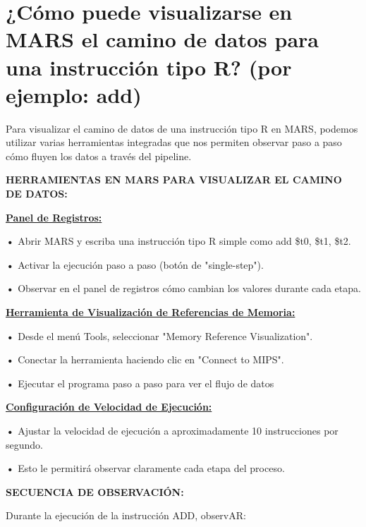 \documentclass{article}
\begin{document}
\section{¿Cómo puede visualizarse en MARS el camino de datos para una instrucción tipo R? (por ejemplo: add)}

\quad

{ Para visualizar el camino de datos de una instrucción tipo R en MARS, podemos utilizar varias herramientas integradas que nos permiten observar paso a paso cómo fluyen los datos a través del pipeline.}

\quad

\textbf{HERRAMIENTAS EN MARS PARA VISUALIZAR EL CAMINO DE DATOS:}

\quad

\textbf{\underline{Panel de Registros: }}

\quad

\textbf{•   } { Abrir MARS y escriba una instrucción tipo R simple como add \$t0, \$t1, \$t2.}

\textbf{•   } { Activar la ejecución paso a paso (botón de "single-step").}

\textbf{•   } { Observar en el panel de registros cómo cambian los valores durante cada etapa.}


\quad

\textbf{\underline{Herramienta de Visualización de Referencias de Memoria: }}

\quad

\textbf{•   } { Desde el menú Tools, seleccionar "Memory Reference Visualization".}

\textbf{•   } { Conectar la herramienta haciendo clic en "Connect to MIPS".}

\textbf{•   } { Ejecutar el programa paso a paso para ver el flujo de datos}

\quad

\textbf{\underline{Configuración de Velocidad de Ejecución: }}

\quad

\textbf{•   } { Ajustar la velocidad de ejecución a aproximadamente 10 instrucciones por segundo.}

\textbf{•   } { Esto le permitirá observar claramente cada etapa del proceso.}

\quad

\textbf{SECUENCIA DE OBSERVACIÓN: }

\quad

{Durante la ejecución de la instrucción ADD, observAR:}
\end{document}
